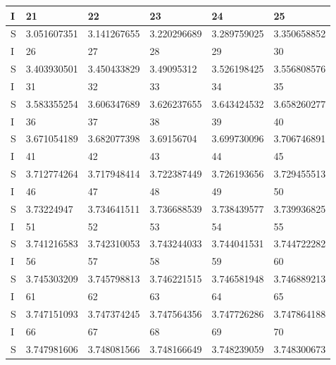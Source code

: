 \documentclass[a4paper, 11pt]{article}
\begin{document}
\begin{enumerate}
\begin{table}[h]
\begin{tabular}{|l|l|l|l|l|l|}
\hline
\hline
I & 21           & 22           & 23          & 24           & 25            \\
\hline
S & 3.051607351  & 3.141267655  & 3.220296689 & 3.289759025  & 3.350658852   \\
\hline
\hline
I & 26           & 27           & 28          & 29           & 30            \\
\hline
S & 3.403930501  & 3.450433829  & 3.49095312  & 3.526198425  & 3.556808576   \\
\hline
\hline
I & 31           & 32           & 33          & 34           & 35            \\
\hline
S & 3.583355254  & 3.606347689  & 3.626237655 & 3.643424532  & 3.658260277   \\
\hline
\hline
I & 36           & 37           & 38          & 39           & 40            \\
\hline
S & 3.671054189  & 3.682077398  & 3.69156704  & 3.699730096  & 3.706746891   \\
\hline
\hline
I & 41           & 42           & 43          & 44           & 45            \\
\hline
S & 3.712774264  & 3.717948414  & 3.722387449 & 3.726193656  & 3.729455513   \\
\hline
\hline
I & 46           & 47           & 48          & 49           & 50            \\
\hline
S & 3.73224947   & 3.734641511  & 3.736688539 & 3.738439577  & 3.739936825   \\
\hline
\hline
I & 51           & 52           & 53          & 54           & 55            \\
\hline
S & 3.741216583  & 3.742310053  & 3.743244033 & 3.744041531  & 3.744722282   \\
\hline
\hline
I & 56           & 57           & 58          & 59           & 60            \\
\hline
S & 3.745303209  & 3.745798813  & 3.746221515 & 3.746581948  & 3.746889213   \\
\hline
\hline
I & 61           & 62           & 63          & 64           & 65            \\
\hline
S & 3.747151093  & 3.747374245  & 3.747564356 & 3.747726286  & 3.747864188   \\
\hline
\hline
I & 66           & 67           & 68          & 69           & 70            \\
\hline
S & 3.747981606  & 3.748081566  & 3.748166649 & 3.748239059  & 3.748300673  \\
\hline


\end{tabular}
\end{table}
\end{enumerate}
\end{document}
